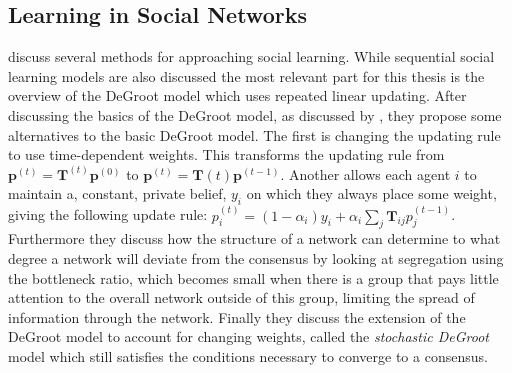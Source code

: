 \documentclass{article}
\begin{document}
\subsection*{Learning in Social Networks \cite{golub2017learning}}
\cite{golub2017learning} discuss several methods for approaching social learning. While sequential social learning models are also discussed the most relevant part for this thesis is the overview of the DeGroot model which uses repeated linear updating. After discussing the basics of the DeGroot model, as discussed by \cite{golub2010naive}, they propose some alternatives to the basic DeGroot model. The first is changing the updating rule to use time-dependent weights. This transforms the updating rule from $\textbf{p}^{(t)} = \textbf{T}^{(t)}\textbf{p}^{(0)}$ to $\textbf{p}^{(t)} = \textbf{T}(t)\textbf{p}^{(t-1)}$. Another allows each agent $i$ to maintain a, constant, private belief, $y_i$ on which they always place some weight, giving the following update rule: $p_i^{(t)} = (1-\alpha_i)y_i + \alpha_i\sum_{j}\textbf{T}_{ij}p_j^{(t-1)}$. \newline
Furthermore they discuss how the structure of a network can determine to what degree a network will deviate from the consensus by looking at segregation using the bottleneck ratio, which becomes small when there is a group that pays little attention to the overall network outside of this group, limiting the spread of information through the network. \newline
Finally they discuss the extension of the DeGroot model to account for changing weights, called the \textit{stochastic DeGroot} model which still satisfies the conditions necessary to converge to a consensus.




\end{document}

